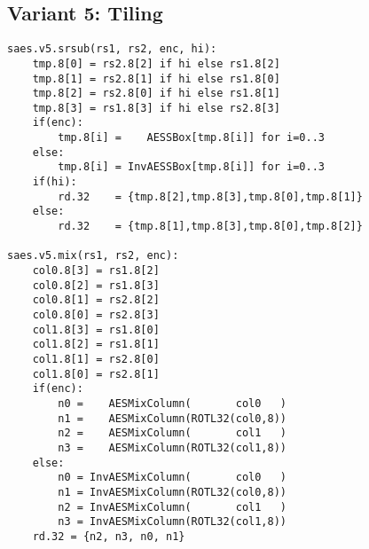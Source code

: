 \subsection{Variant 5: Tiling}

\begin{lstlisting}[language=pseudo]
saes.v5.srsub(rs1, rs2, enc, hi):
    tmp.8[0] = rs2.8[2] if hi else rs1.8[2]
    tmp.8[1] = rs2.8[1] if hi else rs1.8[0]
    tmp.8[2] = rs2.8[0] if hi else rs1.8[1]
    tmp.8[3] = rs1.8[3] if hi else rs2.8[3]
    if(enc):
        tmp.8[i] =    AESSBox[tmp.8[i]] for i=0..3
    else:
        tmp.8[i] = InvAESSBox[tmp.8[i]] for i=0..3
    if(hi):
        rd.32    = {tmp.8[2],tmp.8[3],tmp.8[0],tmp.8[1]}
    else:
        rd.32    = {tmp.8[1],tmp.8[3],tmp.8[0],tmp.8[2]}

saes.v5.mix(rs1, rs2, enc):
    col0.8[3] = rs1.8[2]
    col0.8[2] = rs1.8[3]
    col0.8[1] = rs2.8[2]
    col0.8[0] = rs2.8[3]
    col1.8[3] = rs1.8[0]
    col1.8[2] = rs1.8[1]
    col1.8[1] = rs2.8[0]
    col1.8[0] = rs2.8[1]
    if(enc):
        n0 =    AESMixColumn(       col0   )
        n1 =    AESMixColumn(ROTL32(col0,8))
        n2 =    AESMixColumn(       col1   )
        n3 =    AESMixColumn(ROTL32(col1,8))
    else:
        n0 = InvAESMixColumn(       col0   )
        n1 = InvAESMixColumn(ROTL32(col0,8))
        n2 = InvAESMixColumn(       col1   )
        n3 = InvAESMixColumn(ROTL32(col1,8))
    rd.32 = {n2, n3, n0, n1}
\end{lstlisting}
